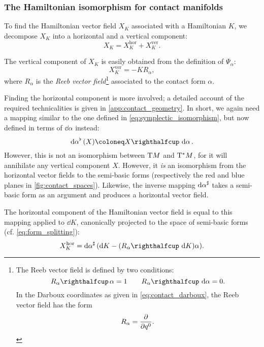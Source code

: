 \subsubsection{The Hamiltonian isomorphism for contact manifolds}
To find the Hamiltonian vector field \(X_K\) associated with a Hamiltonian \(K\), we decompose \(X_K\) into a horizontal and a vertical component:
\begin{equation}
     X_K = X_K^\text{hor} + X_K^\text{ver}.
\end{equation}

The vertical component of \(X_K\) is easily obtained from the definition of \(\Psi_\alpha\):
\begin{equation}
    X_K^\text{ver} = -K R_\alpha,
    \label{eq:vertical_vf}
\end{equation}
where \(R_\alpha\) is the \emph{Reeb vector field}\footnote{
    The Reeb vector field is defined by two conditions: \cite{Libermann1987}
        \begin{equation}
     \intpr{R_\alpha}{\alpha} = 1 \qquad \intpr{R_\alpha}{\dd{\alpha}} = 0.
    \end{equation}
    In the Darboux coordinates as given in \cref{eq:contact_darboux}, the Reeb vector field has the form
    \begin{equation}
     R_\alpha = \pdv{}{q^0}.
    \end{equation}
} 
associated to the contact form \(\alpha\).

Finding the horizontal component is more involved; a detailed account of the required technicalities is given in \cref{app:contact_geometry}. In short, we again need a mapping similar to the one defined in \cref{eq:symplectic_isomorphism}, but now defined in terms of \(\dd{\alpha}\) instead:
\begin{equation}
    \toDual{\dd{\alpha}}(X) \coloneq \intpr{X}{\dd{\alpha}}.
    \label{eq:contact_isomorphism}
\end{equation}
However, this is not an isomorphism between \(\mathrm{T}M\) and \(\mathrm{T}^*M\), for it will annihilate any vertical component \(X\). However, it \emph{is} an isomorphism from the horizontal vector fields to the semi-basic forms (respectively the red and blue planes in \cref{fig:contact_spaces}). Likewise, the inverse mapping \(\dd{\alpha}^\sharp\) takes a semi-basic form as an argument and produces a horizontal vector field. 

The horizontal component of the Hamiltonian vector field is equal to this mapping applied to \(\dd{K}\), canonically projected to the space of semi-basic forms (cf. \cref{eq:form_splitting}):
\begin{equation}
    X_K^\text{hor} = \fromDual{\dd{\alpha}}\qty(\dd{K} - (\intpr{R_\alpha}{\dd{K}})\alpha).
    \label{eq:horizontal_vf}
\end{equation}

